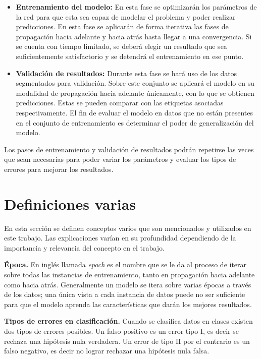 \begin{itemize}
\item \textbf{Entrenamiento del modelo:} En esta fase se optimizarán los parámetros de la red para que esta sea capaz de modelar el problema y poder realizar predicciones. En esta fase se aplicarán de forma iterativa las fases de propagación hacia adelante y hacia atrás hasta llegar a una convergencia. Si se cuenta con tiempo limitado, se deberá elegir un resultado que sea suficientemente satisfactorio y se detendrá el entrenamiento en ese punto.

\item \textbf{Validación de resultados:} Durante esta fase se hará uso de los datos segmentados para validación. Sobre este conjunto se aplicará el modelo en su modalidad de propagación hacia adelante únicamente, con lo que se obtienen predicciones. Estas se pueden comparar con las etiquetas asociadas respectivamente. El fin de evaluar el modelo en datos que no están presentes en el conjunto de entrenamiento es determinar el poder de generalización del modelo.

\end{itemize}

Los pasos de entrenamiento y validación de resultados podrán repetirse las veces que sean necesarias para poder variar los parámetros y evaluar los tipos de errores para mejorar los resultados.

\section{Definiciones varias}

En esta sección se definen conceptos varios que son mencionados y utilizados en este trabajo. Las explicaciones varían en su profundidad dependiendo de la importancia y relevancia del concepto en el trabajo.

\textbf{Época.} En inglés llamada \emph{epoch} es el nombre que se le da al proceso de iterar sobre todas las instancias de entrenamiento, tanto en propagación hacia adelante como hacia atrás. Generalmente un modelo se itera sobre varias épocas a través de los datos; una única vista a cada instancia de datos puede no ser suficiente para que el modelo aprenda las características que darán los mejores resultados.

\textbf{Tipos de errores en clasificación.} Cuando se clasifica datos en clases existen dos tipos de errores posibles. Un falso positivo es un error tipo I, es decir se rechaza una hipótesis nula verdadera. Un error de tipo II por el contrario es un falso negativo, es decir no lograr rechazar una hipótesis nula falsa.

